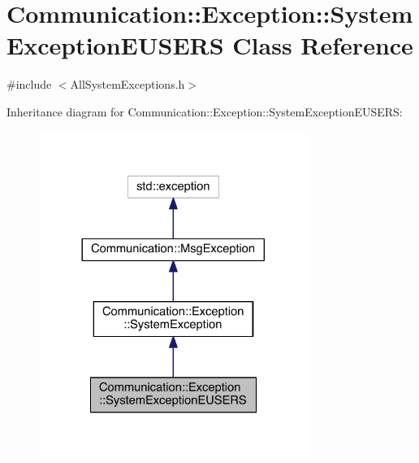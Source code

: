 \hypertarget{class_communication_1_1_exception_1_1_system_exception_e_u_s_e_r_s}{}\section{Communication\+:\+:Exception\+:\+:System\+Exception\+E\+U\+S\+E\+R\+S Class Reference}
\label{class_communication_1_1_exception_1_1_system_exception_e_u_s_e_r_s}


{\ttfamily \#include $<$All\+System\+Exceptions.\+h$>$}



Inheritance diagram for Communication\+:\+:Exception\+:\+:System\+Exception\+E\+U\+S\+E\+R\+S\+:\nopagebreak
\begin{figure}[H]
\begin{center}
\leavevmode
\includegraphics[width=248pt]{class_communication_1_1_exception_1_1_system_exception_e_u_s_e_r_s__inherit__graph}
\end{center}
\end{figure}


